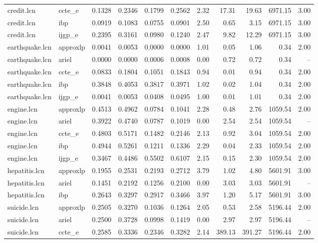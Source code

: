 \begin{table}[ht]
\begin{tabular}{llrrrrrrrrr}
credit.lcn & ccte_e & 0.1328 & 0.2346 & 0.1799 & 0.2562 & 2.32 & 17.31 & 19.63 & 6971.15 & 3.00 \\
credit.lcn & ibp & 0.0919 & 0.1083 & 0.0755 & 0.0901 & 2.50 & 0.65 & 3.15 & 6971.15 & 3.00 \\
credit.lcn & ijgp_e & 0.2395 & 0.3161 & 0.0980 & 0.1240 & 2.47 & 9.82 & 12.29 & 6971.15 & 3.00 \\
earthquake.lcn & approxlp & 0.0041 & 0.0053 & 0.0000 & 0.0000 & 1.01 & 0.05 & 1.06 & 0.34 & 2.00 \\
earthquake.lcn & ariel & 0.0000 & 0.0000 & 0.0006 & 0.0008 & 0.00 & 0.72 & 0.72 & 0.34 & -- \\
earthquake.lcn & ccte_e & 0.0833 & 0.1804 & 0.1051 & 0.1843 & 0.94 & 0.01 & 0.94 & 0.34 & 2.00 \\
earthquake.lcn & ibp & 0.3848 & 0.4053 & 0.3817 & 0.3971 & 1.02 & 0.02 & 1.04 & 0.34 & 2.00 \\
earthquake.lcn & ijgp_e & 0.0041 & 0.0053 & 0.0408 & 0.0495 & 1.00 & 0.01 & 1.01 & 0.34 & 2.00 \\
engine.lcn & approxlp & 0.4513 & 0.4962 & 0.0784 & 0.1041 & 2.28 & 0.48 & 2.76 & 1059.54 & 2.00 \\
engine.lcn & ariel & 0.3922 & 0.4740 & 0.0787 & 0.1019 & 0.00 & 2.54 & 2.54 & 1059.54 & -- \\
engine.lcn & ccte_e & 0.4803 & 0.5171 & 0.1482 & 0.2146 & 2.13 & 0.92 & 3.04 & 1059.54 & 2.00 \\
engine.lcn & ibp & 0.4944 & 0.5261 & 0.1211 & 0.1336 & 2.29 & 0.04 & 2.33 & 1059.54 & 2.00 \\
engine.lcn & ijgp_e & 0.3467 & 0.4486 & 0.5502 & 0.6107 & 2.15 & 0.15 & 2.30 & 1059.54 & 2.00 \\
hepatitis.lcn & approxlp & 0.1955 & 0.2531 & 0.2193 & 0.2712 & 3.79 & 1.02 & 4.80 & 5601.91 & 3.00 \\
hepatitis.lcn & ariel & 0.1451 & 0.2192 & 0.1256 & 0.2100 & 0.00 & 3.03 & 3.03 & 5601.91 & -- \\
hepatitis.lcn & ibp & 0.2643 & 0.3297 & 0.2917 & 0.3466 & 3.97 & 1.20 & 5.17 & 5601.91 & 3.00 \\
suicide.lcn & approxlp & 0.2505 & 0.3270 & 0.1036 & 0.1264 & 2.05 & 0.53 & 2.58 & 5196.44 & 2.00 \\
suicide.lcn & ariel & 0.2500 & 0.3728 & 0.0998 & 0.1419 & 0.00 & 2.97 & 2.97 & 5196.44 & -- \\
suicide.lcn & ccte_e & 0.2585 & 0.3336 & 0.2346 & 0.3282 & 2.14 & 389.13 & 391.27 & 5196.44 & 2.00 \\

\end{tabular}
\end{table}

